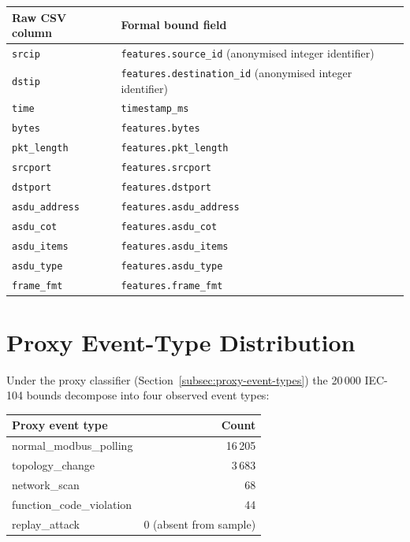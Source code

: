 \begin{center}
\begin{tabular}{ll}
  \toprule
  Raw CSV column & Formal bound field \\
  \midrule
  \texttt{srcip} & \texttt{features.source\_id} (anonymised integer identifier) \\
  \texttt{dstip} & \texttt{features.destination\_id} (anonymised integer identifier) \\
  \texttt{time} & \texttt{timestamp\_ms} \\
  \texttt{bytes} & \texttt{features.bytes} \\
  \texttt{pkt\_length} & \texttt{features.pkt\_length} \\
  \texttt{srcport} & \texttt{features.srcport} \\
  \texttt{dstport} & \texttt{features.dstport} \\
  \texttt{asdu\_address} & \texttt{features.asdu\_address} \\
  \texttt{asdu\_cot} & \texttt{features.asdu\_cot} \\
  \texttt{asdu\_items} & \texttt{features.asdu\_items} \\
  \texttt{asdu\_type} & \texttt{features.asdu\_type} \\
  \texttt{frame\_fmt} & \texttt{features.frame\_fmt} \\
  \bottomrule
\end{tabular}
\label{tab:column-dictionary}
\end{center}

\section{Proxy Event-Type Distribution}
\label{sec:event-type-distribution}

Under the proxy classifier (Section~\ref{subsec:proxy-event-types}) the
20\,000 IEC-104 bounds decompose into four observed event types:

\begin{center}
\begin{tabular}{lr}
  \toprule
  Proxy event type & Count \\
  \midrule
  normal\_modbus\_polling & 16\,205 \\
  topology\_change & 3\,683 \\
  network\_scan & 68 \\
  function\_code\_violation & 44 \\
  replay\_attack & 0 (absent from sample) \\
  \bottomrule
\end{tabular}
\end{center}

